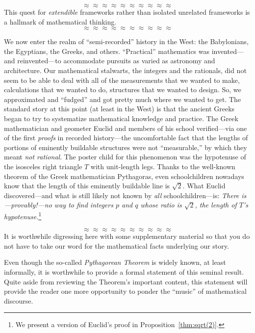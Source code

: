 \[ \approx \approx \approx \approx \approx \approx \approx \approx \approx \approx \]
This quest for {\em extendible} frameworks rather than isolated
  unrelated frameworks is a hallmark of mathematical thinking.
\[ \approx \approx \approx \approx \approx \approx \approx \approx \approx \approx \]

\noindent
We now enter the realm of ``semi-recorded'' history in the West: the
Babylonians, the Egyptians, the Greeks, and others.  ``Practical''
mathematics was invented---and reinvented---to accommodate pursuits as
varied as astronomy and architecture.  Our mathematical stalwarts, the
integers and the rationals, did not seem to be able to deal with all
of the measurements that we wanted to make, calculations that we
wanted to do, structures that we wanted to design.  So, we
approximated and ``fudged'' and got pretty much where we wanted to
get.  The standard story at this point (at least in the West) is that
the ancient Greeks began to try to systematize mathematical knowledge
and practice.  The Greek mathematician and geometer Euclid
 and members of his school verified---via one of the
first {\em proofs} in recorded history---the uncomfortable fact that
the lengths of portions of eminently buildable structures were not
``measurable,'' by which they meant {\em not rational}.  The poster
child for this phenomenon was the hypotenuse of the isosceles right
triangle $T$ with unit-length legs.  Thanks to the well-known theorem
of the Greek mathematician Pythagoras,  even
schoolchildren nowadays know that the length of this eminently
buildable line is $\sqrt{2}$.  What Euclid discovered---and what is
still likely not known by {\em all} schoolchildren---is: {\em There
  is---provably!---no way to find integers $p$ and $q$ whose ratio is
  $\sqrt{2}$, the length of $T$'s hypotenuse.}\footnote{We present a
  version of Euclid's proof in Proposition~\ref{thm:sqrt(2)}.}

\[ \approx \approx \approx \approx \approx \approx \approx \approx \approx \approx \]
It is worthwhile digressing here with some supplementary material so
that you do not have to take our word for the mathematical facts
underlying our story.

Even though the so-called {\it Pythagorean Theorem} is widely known,
at least informally, it is worthwhile to provide a formal statement of
this seminal result.  Quite aside from reviewing the Theorem's
important content, this statement will provide the reader one more
opportunity to ponder the ``music'' of mathematical discourse.

